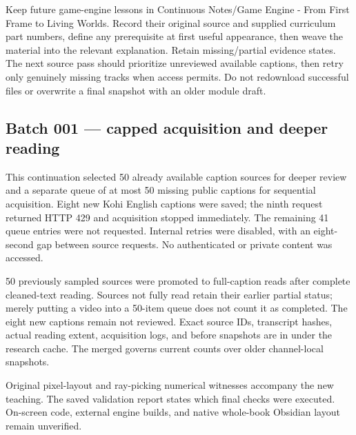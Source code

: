 \hypertarget{appendix-877738f6f4d2-continuing-this-one-volume}{}

Keep future game-engine lessons in {Continuous Notes/Game Engine - From First Frame to Living Worlds}. Record their original source and supplied curriculum part numbers, define any prerequisite at first useful appearance, then weave the material into the relevant explanation. Retain missing/partial evidence states. The next source pass should prioritize unreviewed available captions, then retry only genuinely missing tracks when access permits. Do not redownload successful files or overwrite a final snapshot with an older module draft.

\subsection{Batch 001 --- capped acquisition and deeper reading}\label{appendix-877738f6f4d2-batch-001-capped-acquisition-and-deeper-reading}

\hypertarget{appendix-877738f6f4d2-batch-001-capped-acquisition-and-deeper-reading}{}

This continuation selected 50 already available caption sources for deeper review and a separate queue of at most 50 missing public captions for sequential acquisition. Eight new Kohi English captions were saved; the ninth request returned HTTP 429 and acquisition stopped immediately. The remaining 41 queue entries were not requested. Internal retries were disabled, with an eight-second gap between source requests. No authenticated or private content was accessed.

50 previously sampled sources were promoted to full-caption reads after complete cleaned-text reading. Sources not fully read retain their earlier partial status; merely putting a video into a 50-item queue does not count it as completed. The eight new captions remain not reviewed. Exact source IDs, transcript hashes, actual reading extent, acquisition logs, and before snapshots are in  under the research cache. The merged  governs current counts over older channel-local snapshots.

Original pixel-layout and ray-picking numerical witnesses accompany the new teaching. The saved validation report states which final checks were executed. On-screen code, external engine builds, and native whole-book Obsidian layout remain unverified.

